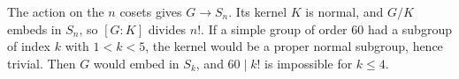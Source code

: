 \documentclass[11pt,a4paper]{article}
\begin{document}
 The action on the $n$ cosets gives $G\to S_n$. Its kernel $K$ is normal, and $G/K$ embeds in $S_n$, so $[G:K]$ divides $n!$.
 If a simple group of order $60$ had a subgroup of index $k$ with $1<k<5$, the kernel would be a proper normal subgroup, hence trivial. Then $G$ would embed in $S_k$, and $60\mid k!$ is impossible for $k\le4$.
\end{document}
